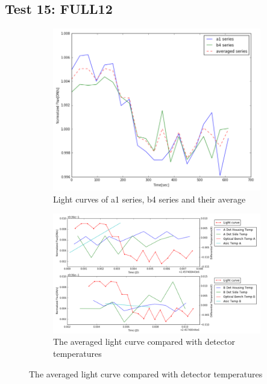 \documentclass{aastex6}
\begin{document}
\subsection{Test 15: FULL12} 
\begin{figure}[H]
    \centering
    \begin{subfigure}{1}
        \includegraphics[scale=0.4]{ts_test15}
        \caption{Light curves of a1 series, b4 series and their average}
    \end{subfigure}

    \begin{subfigure}{2}
        \includegraphics[scale=0.4]{temp_test15}
        \caption{The averaged light curve compared with detector temperatures}
    \end{subfigure}
   

\end{figure}
\end{document}
